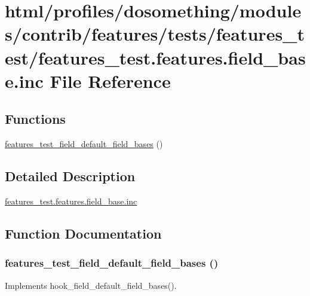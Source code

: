 \hypertarget{features__test_8features_8field__base_8inc}{
\section{html/profiles/dosomething/modules/contrib/features/tests/features\_\-test/features\_\-test.features.field\_\-base.inc File Reference}
\label{features__test_8features_8field__base_8inc}
}
\subsection*{Functions}
\begin{DoxyCompactItemize}
\item 
\hyperlink{features__test_8features_8field__base_8inc_ac926f18f35b50677758eaf9156cf5544}{features\_\-test\_\-field\_\-default\_\-field\_\-bases} ()
\end{DoxyCompactItemize}


\subsection{Detailed Description}
\hyperlink{features__test_8features_8field__base_8inc}{features\_\-test.features.field\_\-base.inc} 

\subsection{Function Documentation}
\hypertarget{features__test_8features_8field__base_8inc_ac926f18f35b50677758eaf9156cf5544}{
\subsubsection[{features\_\-test\_\-field\_\-default\_\-field\_\-bases}]{\setlength{\rightskip}{0pt plus 5cm}features\_\-test\_\-field\_\-default\_\-field\_\-bases ()}}
\label{features__test_8features_8field__base_8inc_ac926f18f35b50677758eaf9156cf5544}
Implements hook\_\-field\_\-default\_\-field\_\-bases(). 